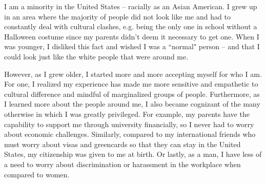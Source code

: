 \documentclass[12pt]{article}
\begin{document}


I am a minority in the United States -- racially as an Asian American. I grew up in an area where the majority of people did not look like me and had to constantly deal with cultural clashes, e.g. being the only one in school without a Halloween costume since my parents didn't deem it necessary to get one. When I was younger, I disliked this fact and wished I was a ``normal" person -- and that I could look just like the white people that were around me.

However, as I grew older, I started more and more accepting myself for who I am. For one, I realized my experience has made me more sensitive and empathetic to cultural difference and mindful of marginalized groups of people. Furthermore, as I learned more about the people around me, I also became cognizant of the many otherwise in which I was greatly privileged. For example, my parents have the capability to support me through university financially, so I never had to worry about economic challenges. Similarly, compared to my international friends who must worry about visas and greencards so that they can stay in the United States, my citizenship was given to me at birth. Or lastly, as a man, I have less of a need to worry about discrimination or harassment in the workplace when compared to women.
\end{document}
